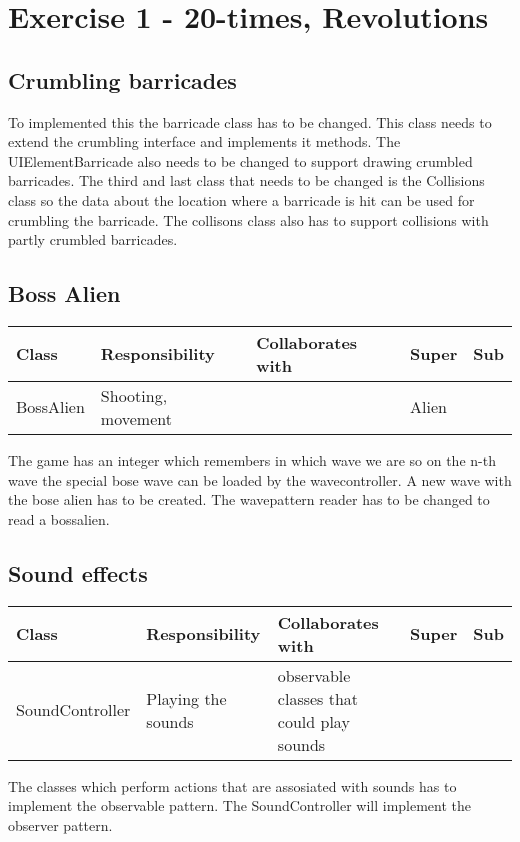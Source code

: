 \section{Exercise 1 - 20-times, Revolutions }
\subsection{Crumbling barricades }
To implemented this the barricade class has to be changed. This class needs to extend the crumbling interface and implements it methods. The UIElementBarricade also needs to be changed to support drawing crumbled barricades. The third and last class that needs to be changed is the Collisions class so the data about the location where a barricade is hit can be used for crumbling the barricade. The collisons class also has to support collisions with partly crumbled barricades.
\subsection{ Boss Alien}
\begin{center}
    \begin{tabular}{ | p{4.5cm} | p{3cm} | p{3cm} | p{3cm} | p{1cm} |}
  \hline
    Class & Responsibility & Collaborates with & Super & Sub \\ \hline
   BossAlien & Shooting, movement  &  & Alien & \\ \hline

    \end{tabular}
\end{center}
The game has an integer which remembers in which wave we are so on the n-th wave the special bose wave can be loaded by the wavecontroller. 
A new wave with the bose alien has to be created. The wavepattern reader has to be changed to read a bossalien.
\subsection{ Sound effects}
\begin{center}
    \begin{tabular}{ | p{4.5cm} | p{3cm} | p{3cm} | p{3cm} | p{1cm} |}
  \hline
    Class & Responsibility & Collaborates with & Super & Sub \\ \hline
   SoundController & Playing the sounds  & observable classes that could play sounds  &  & \\ \hline

    \end{tabular}
\end{center}

The classes which perform actions that are assosiated with sounds has to implement the observable pattern.
The SoundController will implement the observer pattern.
